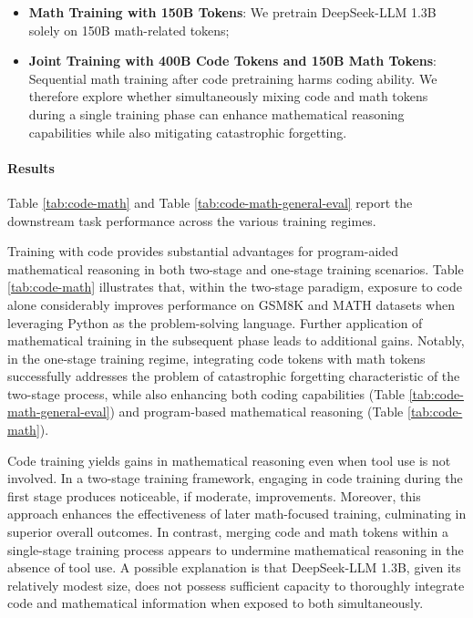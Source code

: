 \begin{itemize}[topsep=0pt]
\begin{itemize}[topsep=0pt]
    \item \textbf{Math Training with 150B Tokens}: We pretrain DeepSeek-LLM 1.3B solely on 150B math-related tokens;
    \item \textbf{Joint Training with 400B Code Tokens and 150B Math Tokens}: Sequential math training after code pretraining harms coding ability. We therefore explore whether simultaneously mixing code and math tokens during a single training phase can enhance mathematical reasoning capabilities while also mitigating catastrophic forgetting.
\end{itemize}

\paragraph{Results}
Table \ref{tab:code-math} and Table \ref{tab:code-math-general-eval} report the downstream task performance across the various training regimes.

Training with code provides substantial advantages for program-aided mathematical reasoning in both two-stage and one-stage training scenarios. Table \ref{tab:code-math} illustrates that, within the two-stage paradigm, exposure to code alone considerably improves performance on GSM8K and MATH datasets when leveraging Python as the problem-solving language. Further application of mathematical training in the subsequent phase leads to additional gains. Notably, in the one-stage training regime, integrating code tokens with math tokens successfully addresses the problem of catastrophic forgetting characteristic of the two-stage process, while also enhancing both coding capabilities (Table \ref{tab:code-math-general-eval}) and program-based mathematical reasoning (Table \ref{tab:code-math}).

Code training yields gains in mathematical reasoning even when tool use is not involved. In a two-stage training framework, engaging in code training during the first stage produces noticeable, if moderate, improvements. Moreover, this approach enhances the effectiveness of later math-focused training, culminating in superior overall outcomes. In contrast, merging code and math tokens within a single-stage training process appears to undermine mathematical reasoning in the absence of tool use. A possible explanation is that DeepSeek-LLM 1.3B, given its relatively modest size, does not possess sufficient capacity to thoroughly integrate code and mathematical information when exposed to both simultaneously.


\end{itemize}
